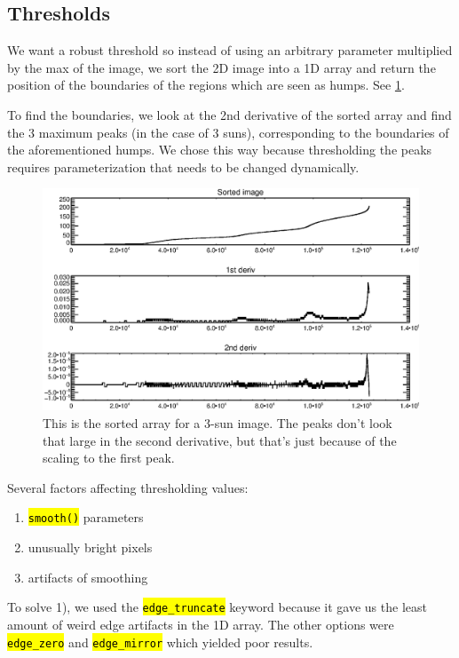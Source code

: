 \documentclass[10pt]{scrartcl}
\begin{document}
\subsection{Thresholds} %
\label{sub:thresholds}
We want a robust threshold so instead of using an arbitrary parameter multiplied by the max of the image, we sort the 2D image into a 1D array and return the position of the boundaries of the regions which are seen as humps. See \cref{peaks}.

To find the boundaries, we look at the 2nd derivative of the sorted array and find the 3 maximum peaks (in the case of 3 suns), corresponding to the boundaries of the aforementioned humps. We chose this way because thresholding the peaks requires parameterization that needs to be changed dynamically. 

\begin{figure}[!ht]
   \includegraphics[width=.75\textwidth]{../plots_tables_images/sortedarray.eps}%
   \caption{This is the sorted array for a 3-sun image. The peaks don't look that large in the second derivative, but that's just because of the scaling to the first peak.}\label{peaks}
\end{figure}

Several factors affecting thresholding values:

\begin{enumerate}
    \item \hl{\texttt{smooth()}} parameters
    \item unusually bright pixels
    \item artifacts of smoothing
\end{enumerate}

To solve 1), we used the \hl{\texttt{edge\_truncate}} keyword because it gave us the least amount of weird edge artifacts in the 1D array. The other options were \hl{\texttt{edge\_zero}} and \hl{\texttt{edge\_mirror}} which yielded poor results.
\end{document}
